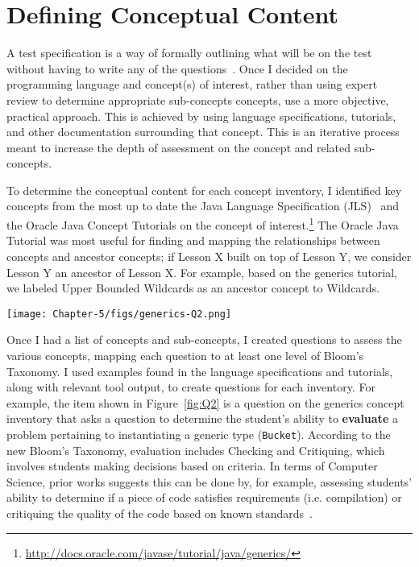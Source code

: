 \section{Defining Conceptual Content}

A test specification is a way of formally outlining what will be on the test without having to write any of the questions~\cite{tew2010developing}. Once I decided on the programming language and concept(s) of interest, rather than using expert review to determine appropriate sub-concepts concepts, use a more objective, practical approach. This is achieved by using language specifications, tutorials, and other documentation surrounding that concept. This is an iterative process meant to increase the depth of assessment on the concept and related sub-concepts.

To determine the conceptual content for each concept inventory, I identified key concepts from the most up to date the Java Language Specification (JLS)~\cite{Gosling:1996:JLS:560667} and the Oracle Java Concept Tutorials on the concept of interest.\footnote{\url{http://docs.oracle.com/javase/tutorial/java/generics/}} The Oracle Java Tutorial was most useful for finding and mapping the relationships between concepts and ancestor concepts; if Lesson X built on top of Lesson Y, we consider Lesson Y an ancestor of Lesson X. For example, based on the generics tutorial, we labeled Upper Bounded Wildcards as an ancestor concept to Wildcards. 

	\begin{figure*}[ht]
		\centering
		\texttt{[image: Chapter-5/figs/generics-Q2.png]}
		\caption{Question assessing ability to evaluate generic type instantiation.\label{fig:Q2}}
	\end{figure*}	
	
Once I had a list of concepts and sub-concepts, I created questions to assess the various concepts, mapping each question to at least one level of Bloom's Taxonomy. I used examples found in the language specifications and tutorials, along with relevant tool output, to create questions for each inventory. For example, the item shown in Figure~\ref{fig:Q2} is a question on the generics concept inventory that asks a question to determine the student's ability to \textbf{evaluate} a problem pertaining to instantiating a generic type (\texttt{Bucket}). According to the new Bloom's Taxonomy, evaluation includes Checking and Critiquing, which involves students making decisions based on criteria. In terms of Computer Science, prior works suggests this can be done by, for example, assessing students' ability to determine if a piece of code satisfies requirements (i.e. compilation) or critiquing the quality of the code based on known standards~\cite{thompson2008bloom}.

